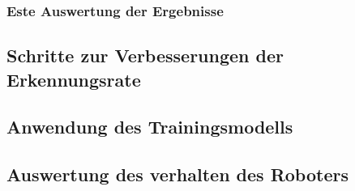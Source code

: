 \documentclass[conference]{IEEEtran}
\begin{document}
	\subsubsection{Este Auswertung der Ergebnisse}	%
	\subsection{Schritte zur Verbesserungen der Erkennungsrate} %
	\subsection{Anwendung des Trainingsmodells } %
	\subsection {Auswertung des verhalten des Roboters}	%
	
\end{document}
